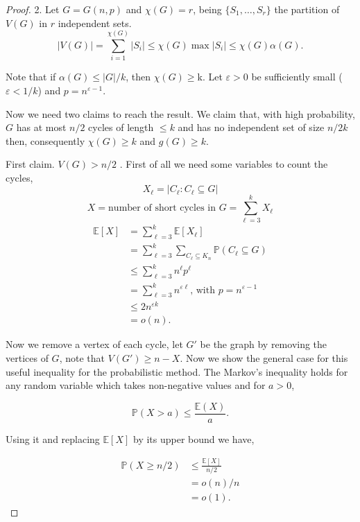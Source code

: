 \documentclass[12pt,twoside,a4paper,bibliography=totocnumbered]{book}
\numberwithin{equation}{section}
\theoremstyle{remark}
\begin{document}
\begin{proof}2. Let $G = G(n,p)$ and $\chi(G) = r$, being $\{S_1, \ldots, S_{r}\}$ the partition of $V(G)$ in $r$ independent sets.
$$ |V(G)| = \sum_{i=1}^{\chi(G)} |S_i| \leq \chi(G)\max|S_i| \leq \chi(G) \alpha (G) .$$

Note that if $\alpha(G) \leq |G|/k$, then $\chi(G) \geq $k. Let $\varepsilon > 0$ be sufficiently small ($\varepsilon < 1/k$) and $p = n^{\varepsilon - 1}$.%

Now we need two claims to reach the result. We claim that, with high probability, $G$ has at most $n/2$ cycles of length $\leq k$ and has no independent set  of size $n/2k$ then, consequently $\chi(G) \geq k$ and $g(G) \geq k$.

First claim. $V(G) > n/2$ . First of all we need some variables to count the cycles,
$$X_{\ell} =  |C_{\ell} \colon C_{\ell} \subseteq G|$$
$$X = \text{number of short cycles in $G$} = \sum_{{\ell}=3}^k X_{\ell}$$
\begin{align*}
\mathbb{E}[X] &= \sum_{{\ell}=3}^k \mathbb{E}[X_{\ell}] \\
	       &= \sum_{{\ell}=3}^k \sum_{C_{\ell} \subseteq K_n} \mathbb{P}(C_{\ell} \subseteq G)\\
	       &\leq \sum_{{\ell}=3}^k n^{\ell} p^{\ell} \\
	       &= \sum_{{\ell}=3}^k n^{\varepsilon {\ell}}\text{, with } p= n^{\varepsilon - 1}\\
	       &\leq 2n^{\varepsilon k} \\
	       &= o(n).
\end{align*}

Now we remove a vertex of each cycle, let $G'$ be the graph by removing the vertices of $G$, note that $V(G') \geq n-X$. Now we show the general case for this useful inequality for the probabilistic method. The Markov's inequality holds for any random variable which takes non-negative values and for $a>0$,

$$\mathbb{P}(X>a) \leq \frac{\mathbb{E}(X)}{a}.$$

Using it and replacing $\mathbb{E}[X]$ by its upper bound we have,

\begin{align*}
\mathbb{P}(X\geq n/2) &\leq \frac{\mathbb{E}[X]}{n/2}\\
		& = o(n)/n\\
		& = o(1).
\end{align*}


\end{proof}
\end{document}
